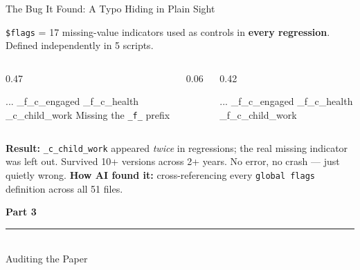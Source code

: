 \documentclass[aspectratio=169, 10pt]{beamer}
\begin{document}
\begin{frame}[fragile]{The Bug It Found: A Typo Hiding in Plain Sight}
\vskip-2pt
\begin{tcolorbox}[keybox, title={\faBug\quad The \texttt{\$flags} variable list}, top=2pt, bottom=2pt]
\small
\texttt{\$flags} = 17 missing-value indicators used as controls in \textbf{every regression}. Defined independently in 5 scripts.
\end{tcolorbox}
\vskip3pt
\begin{columns}[T]
\begin{column}{0.47\textwidth}
\begin{tcolorbox}[colback=SoftCoral!8, colframe=SoftCoral, boxrule=0.5pt, arc=2pt, left=5pt, right=5pt, top=3pt, bottom=3pt]
\vskip3pt
{\ttfamily\small\color{DeepCharcoal}
... \_f\_c\_engaged \_f\_c\_health\\
\colorbox{SoftCoral!20}{\_c\_child\_work}}
\vskip2pt
{\scriptsize Missing the \texttt{\_f\_} prefix}
\end{tcolorbox}
\end{column}
\begin{column}{0.06\textwidth}
\centering\vskip0.8cm
{\large\color{UVMGold}\faArrowRight}
\end{column}
\begin{column}{0.42\textwidth}
\begin{tcolorbox}[colback=PaleSage, colframe=SlateTeal!50, boxrule=0.5pt, arc=2pt, left=5pt, right=5pt, top=3pt, bottom=3pt]
\vskip3pt
{\ttfamily\small\color{DeepCharcoal}
... \_f\_c\_engaged \_f\_c\_health\\
\colorbox{PaleSage!50}{\_f\_c\_child\_work}}
\end{tcolorbox}
\end{column}
\end{columns}
\vskip3pt
\begin{tcolorbox}[quotebox, top=2pt, bottom=2pt]
\scriptsize \textbf{Result:} \texttt{\_c\_child\_work} appeared \textit{twice} in regressions; the real missing indicator was left out. Survived 10+ versions across 2+ years. No error, no crash --- just quietly wrong.
\textbf{How AI found it:} cross-referencing every \texttt{global flags} definition across all 51 files.
\end{tcolorbox}
\end{frame}

{
\begin{frame}
\centering\vfill
{\fontsize{22}{28}\bfseries\selectfont\color{white} Part 3}\\[6pt]
{\color{UVMGold}\rule{5cm}{0.8pt}}\\[6pt]
{\normalsize\color{UVMGold} Auditing the Paper}\\[4pt]
\vfill
\end{frame}
}
\end{document}
